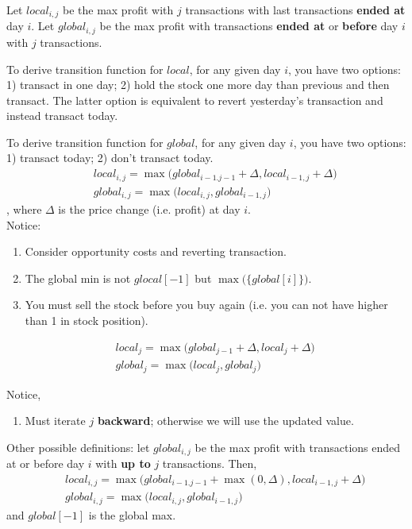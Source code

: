 {Let $local_{i, j}$ be the max profit with $j$ transactions with last transactions \textbf{ended at} day $i$. Let $global_{i, j}$ be the max profit with transactions \textbf{ended at} or \textbf{before} day $i$ with $j$ transactions. 

To derive transition function for $local$, for any given day $i$, you have two options: 1) transact in one day; 2) hold the stock one more day than previous and then transact. The latter option is equivalent to revert yesterday's transaction and instead transact today. 

To derive transition function for $global$, for any given day $i$, you have two options: 1) transact today; 2) don't transact today. 
\begin{eqnarray*}
&& local_{i,j} = \max\Big(global_{i-1.j-1}+\Delta, local_{i-1,j}+\Delta\Big) \nonumber \\
&& global_{i,j} = \max\Big(local_{i, j}, global_{i-1,j}\Big)
\end{eqnarray*}
, where $\Delta$ is the price change (i.e. profit) at day $i$.\\
Notice:
\begin{enumerate}
\item Consider opportunity costs and reverting transaction.
\item The global min is not $glocal[-1]$ but $\max\big(\{global[i]\}\big)$.
\item You must sell the stock before you buy again (i.e. you can not have higher than 1 in stock position). 
\end{enumerate}

\begin{eqnarray*}
&& local_{j} = \max\Big(global_{j-1} + \Delta, local_{j}+\Delta\Big)
\nonumber \\
&& global_{j} = \max\Big(local_{j}, global_{j}\Big)
\end{eqnarray*}

Notice,
\begin{enumerate}
\item Must iterate $j$ \textbf{backward}; otherwise we will use the updated value. 
\end{enumerate}

Other possible definitions: let $global_{i, j}$ be the max profit
with transactions ended at or before day $i$ with \textbf{up to} $j$ transactions. Then, 
\begin{eqnarray*}
&& local_{i,j} = \max\Big(global_{i-1.j-1} + \max(0, \Delta), local_{i-1,j}+\Delta\Big)
\nonumber \\
&& global_{i,j} = \max\Big(local_{i, j}, global_{i-1,j}\Big)
\end{eqnarray*}
and $global[-1]$ is the global max. 

}
